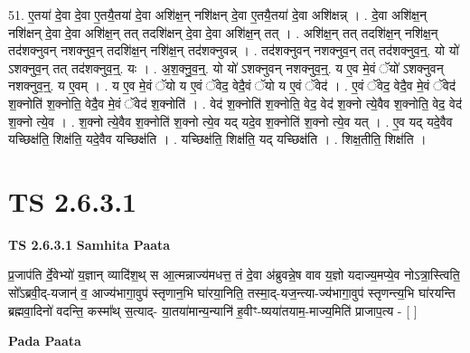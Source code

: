 \documentclass[17pt]{extarticle}
\begin{document}
51. ए॒तया॑ दे॒वा दे॒वा ए॒तयै॒तया॑ दे॒वा अशि॑क्ष॒न् नशि॑क्षन् दे॒वा ए॒तयै॒तया॑ दे॒वा अशि॑क्षन्न् । . दे॒वा अशि॑क्ष॒न् नशि॑क्षन् दे॒वा दे॒वा अशि॑क्ष॒न् तत् तदशि॑क्षन् दे॒वा दे॒वा अशि॑क्ष॒न् तत् । . अशि॑क्ष॒न् तत् तदशि॑क्ष॒न् नशि॑क्ष॒न् तद॑शक्नुवन् नशक्नुव॒न् तदशि॑क्ष॒न् नशि॑क्ष॒न् तद॑शक्नुवन्न् । . तद॑शक्नुवन् नशक्नुव॒न् तत् तद॑शक्नुव॒न्॒. यो यो॑ ऽशक्नुव॒न् तत् तद॑शक्नुव॒न्॒. यः । . अ॒श॒क्नु॒व॒न्॒. यो यो॑ ऽशक्नुवन् नशक्नुव॒न्॒. य ए॒व मे॒वं ॅयो॑ ऽशक्नुवन् नशक्नुव॒न्॒. य ए॒वम् । . य ए॒व मे॒वं ॅयो य ए॒वं ॅवेद॒ वेदै॒वं ॅयो य ए॒वं ॅवेद॑ । . ए॒वं ॅवेद॒ वेदै॒व मे॒वं ॅवेद॑ श॒क्नोति॑ श॒क्नोति॒ वेदै॒व मे॒वं ॅवेद॑ श॒क्नोति॑ । . वेद॑ श॒क्नोति॑ श॒क्नोति॒ वेद॒ वेद॑ श॒क्नो त्ये॒वैव श॒क्नोति॒ वेद॒ वेद॑ श॒क्नो त्ये॒व । . श॒क्नो त्ये॒वैव श॒क्नोति॑ श॒क्नो त्ये॒व यद् यदे॒व श॒क्नोति॑ श॒क्नो त्ये॒व यत् । . ए॒व यद् यदे॒वैव यच्छिक्ष॑ति॒ शिक्ष॑ति॒ यदे॒वैव यच्छिक्ष॑ति । . यच्छिक्ष॑ति॒ शिक्ष॑ति॒ यद् यच्छिक्ष॑ति । . शिक्ष॒तीति॒ शिक्ष॑ति । \newline
\pagebreak
{}
\section*{ TS 2.6.3.1 }

\textbf{TS 2.6.3.1 } \newline
\textbf{Samhita Paata} \newline

प्र॒जाप॑ति र्दे॒वेभ्यो॑ य॒ज्ञान् व्यादि॑श॒थ् स आ॒त्मन्नाज्य॑मधत्त॒ तं दे॒वा अ॑ब्रुवन्ने॒ष वाव य॒ज्ञो यदाज्य॒मप्ये॒व नोऽत्रा॒स्त्विति॒ सो᳚ऽब्रवी॒द्-यजान्॑ व॒ आज्य॑भागा॒वुप॑ स्तृणान॒भि घा॑रया॒निति॒ तस्मा॒द्-यज॒न्त्या-ज्य॑भागा॒वुप॑ स्तृणन्त्य॒भि घा॑रयन्ति ब्रह्मवा॒दिनो॑ वदन्ति॒ कस्मा᳚थ् स॒त्याद्- या॒तया॑मान्य॒न्यानि॑ ह॒वीꣳ-ष्यया॑तयाम॒-माज्य॒मिति॑ प्राजाप॒त्य - [  ] \newline

\textbf{Pada Paata} \newline
\end{document}
